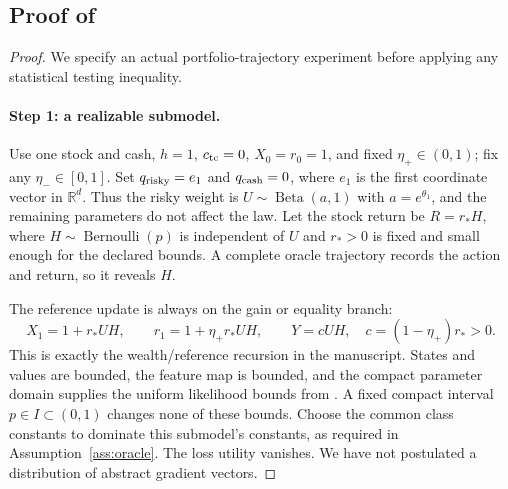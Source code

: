 \documentclass[11pt]{article}
\newcommand{\R}{\mathbb R}
\newcommand{\1}{\mathbf 1}
\theoremstyle{definition}
\begin{document}
\subsection{Proof of \texorpdfstring{}{the minimax theorem}}
\begin{proof}
We specify an actual portfolio-trajectory experiment before applying any statistical testing inequality.

\paragraph{Step 1: a realizable submodel.}
Use one stock and cash, $h=1$, $c_{\rm tc}=0$, $X_0=r_0=1$, and fixed $\eta_+\in(0,1)$; fix any $\eta_-\in[0,1]$. Set $q_{\rm risky}=e_1$ and $q_{\rm cash}=0$, where $e_1$ is the first coordinate vector in $\R^d$. Thus the risky weight is $U\sim\operatorname{Beta}(a,1)$ with $a=e^{\theta_1}$, and the remaining parameters do not affect the law. Let the stock return be $R=r_*H$, where $H\sim\operatorname{Bernoulli}(p)$ is independent of $U$ and $r_*>0$ is fixed and small enough for the declared bounds. A complete oracle trajectory records the action and return, so it reveals $H$.

The reference update is always on the gain or equality branch:
\[
 X_1=1+r_*UH,\qquad
 r_1=1+\eta_+r_*UH,\qquad
 Y=cUH,\quad c=(1-\eta_+)r_*>0.
\]
This is exactly the wealth/reference recursion in the manuscript. States and values are bounded, the feature map is bounded, and the compact parameter domain supplies the uniform likelihood bounds from . A fixed compact interval $p\in I\subset(0,1)$ changes none of these bounds. Choose the common class constants to dominate this submodel's constants, as required in Assumption~\ref{ass:oracle}. The loss utility vanishes. We have not postulated a distribution of abstract gradient vectors.


\end{proof}
\end{document}

